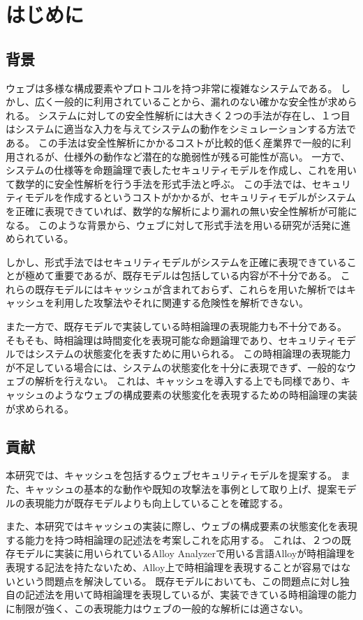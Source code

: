 \documentclass[journal]{IEEEtran}
\begin{document}
\section{はじめに}
\label{sec:introduction}

\subsection{背景}
ウェブは多様な構成要素やプロトコルを持つ非常に複雑なシステムである。
しかし、広く一般的に利用されていることから、漏れのない確かな安全性が求められる。
システムに対しての安全性解析には大きく２つの手法が存在し、１つ目はシステムに適当な入力を与えてシステムの動作をシミュレーションする方法である。
この手法は安全性解析にかかるコストが比較的低く産業界で一般的に利用されるが、仕様外の動作など潜在的な脆弱性が残る可能性が高い。
一方で、システムの仕様等を命題論理で表したセキュリティモデルを作成し、これを用いて数学的に安全性解析を行う手法を形式手法と呼ぶ。
この手法では、セキュリティモデルを作成するというコストがかかるが、セキュリティモデルがシステムを正確に表現できていれば、数学的な解析により漏れの無い安全性解析が可能になる。
このような背景から、ウェブに対して形式手法を用いる研究が活発に進められている\cite{based-model, cookie-model}。

しかし、形式手法ではセキュリティモデルがシステムを正確に表現できていることが極めて重要であるが、既存モデル\cite{based-model, cookie-model}は包括している内容が不十分である。
これらの既存モデルにはキャッシュが含まれておらず、これらを用いた解析ではキャッシュを利用した攻撃法やそれに関連する危険性を解析できない。

また一方で、既存モデルで実装している時相論理の表現能力も不十分である。
そもそも、時相論理は時間変化を表現可能な命題論理であり、セキュリティモデルではシステムの状態変化を表すために用いられる。
この時相論理の表現能力が不足している場合には、システムの状態変化を十分に表現できず、一般的なウェブの解析を行えない。
これは、キャッシュを導入する上でも同様であり、キャッシュのようなウェブの構成要素の状態変化を表現するための時相論理の実装が求められる。

\subsection{貢献}
本研究では、キャッシュを包括するウェブセキュリティモデルを提案する。
また、キャッシュの基本的な動作や既知の攻撃法を事例として取り上げ、提案モデルの表現能力が既存モデルよりも向上していることを確認する。

また、本研究ではキャッシュの実装に際し、ウェブの構成要素の状態変化を表現する能力を持つ時相論理の記述法を考案しこれを応用する。
これは、２つの既存モデルに実装に用いられているAlloy Analyzerで用いる言語Alloyが時相論理を表現する記法を持たないため、Alloy上で時相論理を表現することが容易ではないという問題点を解決している。
既存モデル\cite{based-model, cookie-model}においても、この問題点に対し独自の記述法を用いて時相論理を表現しているが、実装できている時相論理の能力に制限が強く、この表現能力はウェブの一般的な解析には適さない。
\end{document}
